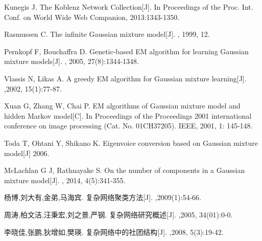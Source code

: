 \documentclass[a4paper,12pt,openany,oneside,utf-8]{ctexbook}
\begin{document}
\begin{spacing}{1.2}
\begin{thebibliography}{1}
{            
            
            Kunegis J.
              {The} {Koblenz} {Network} {Collection}[J].
            \newblock In Proceedings of the Proc. Int. Conf. on World Wide Web Companion,
              2013:1343-1350.}
              
            Rasmussen C.
            \newblock The infinite Gaussian mixture model[J].
            ,{ 1999},
              { 12}.
            
            Pernkopf F, Bouchaffra D.
            \newblock Genetic-based EM algorithm for learning Gaussian mixture models[J].
              ,{ 2005}, { 27(8):1344-1348}.
            
            Vlassis N, Likas A.
            \newblock A greedy EM algorithm for Gaussian mixture learning[J].
            ,{2002}, { 15(1):77-87}.
            
            Xuan G, Zhang W, Chai P.
            \newblock EM algorithms of Gaussian mixture model and hidden Markov model[C].
            \newblock In Proceedings of the Proceedings 2001 international conference on
              image processing (Cat. No. 01CH37205). IEEE, 2001, 1: 145-148.
            
            Toda T, Ohtani Y, Shikano K.
            \newblock Eigenvoice conversion based on Gaussian mixture model[J] {2006}.
            
            McLachlan G J, Rathnayake S.
            \newblock On the number of components in a Gaussian mixture model[J].
             ,{ 2014}, {4(5):341-355}.
            
            杨博,刘大有,金弟,马海宾.
            \newblock 复杂网络聚类方法[J].
            ,{2009(1):54-66}.
            

            周涛,柏文洁,汪秉宏,刘之景,严钢.
            \newblock 复杂网络研究概述[J].
            ,{2005}, { 34(01):0-0}.
            
            李晓佳,张鹏,狄增如,樊瑛.
            \newblock 复杂网络中的社团结构[J].
             ,{2008}, {5(3):19-42}.
            

\end{thebibliography}
\end{spacing}
\end{document}
